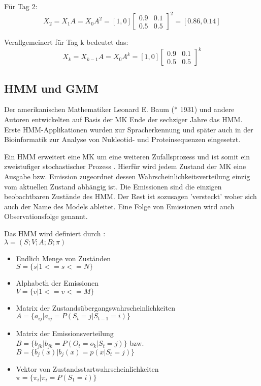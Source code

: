 Für Tag 2:\\
\[ X_2 = X_1 A = X_0 A^2 = [ 1, 0 ] \begin {bmatrix} 0.9&0.1\\0.5&0.5 \end {bmatrix}^2 = [ 0.86, 0.14] \] 

Verallgemeinert für Tag k bedeutet das: 
\[ X_k = X_{k-1} A = X_0 A^k = [ 1, 0 ] \begin {bmatrix} 0.9&0.1\\0.5&0.5 \end {bmatrix}^k \] 


\subsection{\acl{HMM} und \acl{GMM}}  \label{sec:hmm}
Der amerikanischen Mathematiker Leonard E. Baum (* 1931) und andere Autoren entwickelten auf Basis der \acl{MK} Ende der 
sechziger Jahre das \acl{HMM}. Erste \acl{HMM}-Applikationen wurden zur Spracherkennung und später auch in der Bioinformatik 
zur Analyse von Nukleotid- und Proteinsequenzen eingesetzt. 

Ein \acl{HMM} erweitert eine \acl{MK} um eine weiteren Zufallsprozess und ist
somit ein zweistufiger stochastischer Prozess \cite[67]{mmmFink}. Hierfür wird
jedem Zustand der \acl{MK} eine Ausgabe bzw. Emission zugeordnet dessen
Wahrscheinlichkeitsverteilung einzig vom aktuellen Zustand abhängig ist. Die
Emissionen sind die einzigen beobachtbaren Zustände des \acl{HMM}. Der Rest
ist sozusagen 'versteckt' woher sich auch der Name des Models ableitet. Eine
Folge von Emissionen wird auch Observationsfolge genannt.


Das \acl{HMM} wird definiert durch \cite[68]{mmmFink}:\\ 
\( \lambda = (S;V;A;B;\pi)\)
\begin{itemize}
     \item Endlich Menge von Zuständen \\
           \( S = \{ s | 1 <= s <= N \} \)
     \item Alphabeth der Emissionen \\
           \( V = \{ v | 1 <= v <= M \} \)
     \item Matrix der Zustandsübergangswahrscheinlichkeiten \\
           \( A = \{ a_{ij} | a_{ij} = P(S_t = j | S_{t-1} = i) \} \)
     \item Matrix der Emissionsverteilung \\
           \( B = \{ b_{jk} | b_{jk} = P(O_t = o_k | S_t = j) \} \) bzw. \( B =
           \{ b_{j}(x) | b_{j}(x) = p(x|S_t = j) \} \)
     \item Vektor von Zustandsstartwahrscheinlichkeiten \\
           \( \pi = \{ \pi_i | \pi_i = P(S_1 = i) \} \) 
\end{itemize}

